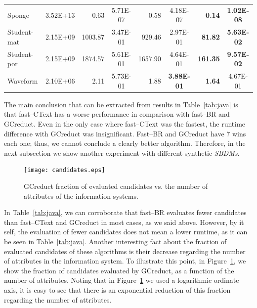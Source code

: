 \documentclass[number,preprint,review,12pt]{elsarticle}
\begin{document}
\begin{table}[!htb]
\begin{tabular}{|l|c|r|c|r|c|r|c|}
			Sponge           & 3.52E+13 & 0.63          & 5.71E-07 & 0.58             & 4.18E-07          & \textbf{0.14}   & \textbf{1.02E-08} \\
 			Student-mat      & 2.15E+09 & 1003.87       & 3.47E-01 & 929.46           & 2.97E-01          & \textbf{81.82}  & \textbf{5.63E-02} \\
			Student-por      & 2.15E+09 & 1874.57       & 5.61E-01 & 1657.90          & 4.64E-01          & \textbf{161.35} & \textbf{9.57E-02} \\
			Waveform         & 2.10E+06 & 2.11          & 5.73E-01 & 1.88             & \textbf{3.88E-01} & \textbf{1.64}   & 4.67E-01          \\
			\hline
		\end{tabular}
	\end{table}

    The main conclusion that can be extracted from results in Table~\ref{tab:java} is that fast--CText has a worse performance in comparison with fast--BR and GCreduct. Even in the only case where fast--CText was the fastest, the runtime difference with GCreduct was insignificant. Fast--BR and GCreduct have 7 wins each one; thus, we cannot conclude a clearly better algorithm. Therefore, in the next subsection we show another experiment with different synthetic \textit{SBDMs}.
					
	\begin{figure}[htb]
		\begin{center}
			\texttt{[image: candidates.eps]}
		\end{center}
		\caption{GCreduct fraction of evaluated candidates vs. the number of attributes of the information systems.}
		\label{fig:candidates}
	\end{figure}
	
	In Table~\ref{tab:java}, we can corroborate that fast--BR evaluates fewer candidates than fast--CText and GCreduct in most cases, as we said above. However, by it self, the evaluation of fewer candidates does not mean a lower runtime, as it can be seen in Table~\ref{tab:java}. Another interesting fact about the fraction of evaluated candidates of these algorithms is their decrease regarding the number of attributes in the information system. To illustrate this point, in Figure~\ref{fig:candidates}, we show the fraction of candidates evaluated by GCreduct, as a function of the number of attributes. Noting that in Figure~\ref{fig:candidates} we used a logarithmic ordinate axis, it is easy to see that there is an exponential reduction of this fraction regarding the number of attributes.
		
\end{document}
